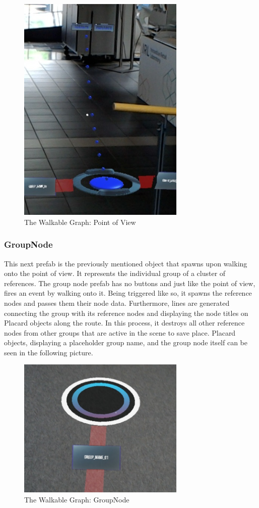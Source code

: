 \documentclass[12pt,a4paper,oneside,american,parskip=half]{article}
\begin{document}
\begin{justify}
\begin{normalsize}
\begin{figure}[h!]
\centering
\includegraphics[width=8cm]{pov.jpg}
\caption{The Walkable Graph: Point of View}
\end{figure} \par


\subsubsection{GroupNode}
This next prefab is the previously mentioned object that spawns upon walking onto the point of view. It represents the individual group of a cluster of references. The group node prefab has no buttons and just like the point of view, fires an event by walking onto it. Being triggered like so, it spawns the reference nodes and passes them their node data.
Furthermore, lines are generated connecting the group with its reference nodes and displaying the node titles on Placard objects along the route. In this process, it destroys all other reference nodes from other groups that are active in the scene to save place. Placard objects, displaying a placeholder group name, and the group node itself can be seen in the following picture.
\clearpage

\begin{figure}[h!]
\centering
\includegraphics[width=8cm]{groupNode.jpg}
\caption{The Walkable Graph: GroupNode}
\end{figure} \par


\end{normalsize}
\end{justify}
\end{document}
